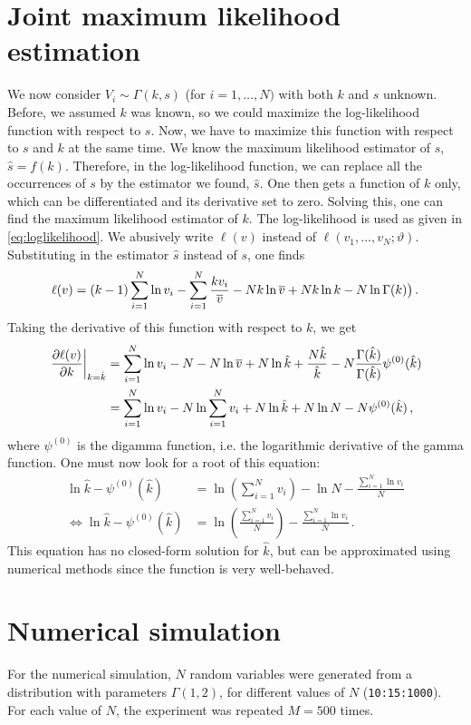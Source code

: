 \documentclass[final]{aomart}
\newtheorem[{}\it]{thm}{Theorem}[section]
\theoremstyle{definition}
\newtheorem*[{}\it]{notation}{Notation}
\numberwithin{equation}{section}
\newcommand{\dig}{\psi^{(0)}}
\renewcommand{\theta}{\vartheta}
\newcommand{\eval}[2][\right]{\relax
  \ifx#1\right\relax \left.\fi#2#1\rvert}
\begin{document}
\section{Joint maximum likelihood estimation}
\label{sec:joint}
We now consider \(V_i \sim \Gamma(k, s)\) (for \(i = 1,\ldots,N)\) with both \(k\) and \(s\) unknown.
Before, we assumed \(k\) was known, so we could maximize the log-likelihood function with respect to \(s\).
Now, we have to maximize this function with respect to \(s\) and \(k\) at the same time.
We know the maximum likelihood estimator of \(s\), \(\hat{s} = f(k)\).
Therefore, in the log-likelihood function, we can replace all the occurrences of \(s\) by the estimator we found, \(\hat{s}\).
One then gets a function of \(k\) only, which can be differentiated and its derivative set to zero.
Solving this, one can find the maximum likelihood estimator of \(k\).
The log-likelihood is used as given in \eqref{eq:loglikelihood}.
We abusively write \(\ell(v)\) instead of \(\ell(v_1, \ldots, v_N; \theta)\).
Substituting in the estimator \(\hat{s}\) instead of \(s\), one finds
\begin{align}
\ell(v) = (k-1) \sum_{i=1}^{N}\ln v_i - \sum_{i=1}^{N} \frac{kv_i}{\overline{v}} - N k \ln \overline{v} + N k \ln k - N \ln \Gamma(k)\big)\,.
\end{align}
Taking the derivative of this function with respect to \(k\), we get
\begin{align}
\eval{\frac{\partial \ell(v)}{\partial k}}_{k = \hat{k}} &= \sum_{i=1}^N \ln v_i - N - N \ln \widebar{v} + N \ln \hat{k} + \frac{N\hat{k}}{\hat{k}} - N\frac{\Gamma(\hat{k})}{\Gamma(\hat{k})}\dig(\hat{k})\\
&= \sum_{i=1}^N \ln v_i - N \ln \sum_{i=1}^N v_i + N \ln \hat{k}  + N \ln N - N \dig(\hat{k})\,,
\end{align}
where \(\dig\) is the digamma function, i.e. the logarithmic derivative of the gamma function.
One must now look for a root of this equation:
\begin{align}
\ln \hat{k} - \dig(\hat{k}) &= \ln \left(\sum_{i=1}^N v_i\right) - \ln N - \frac{\sum_{i=1}^N \ln v_i}{N}\\
\iff \ln \hat{k}  - \dig(\hat{k}) &= \ln \left(\frac{\sum_{i=1}^N v_i}{N}\right) - \frac{\sum_{i=1}^N \ln v_i}{N}\,.\label{eq:mlk}
\end{align}
This equation has no closed-form solution for \(\hat{k}\), but can be approximated using numerical methods since the function is very well-behaved.

\section{Numerical simulation}
For the numerical simulation, \(N\) random variables were generated from a distribution with parameters \(\Gamma(1, 2)\), for different values of \(N\) (\texttt{10:15:1000}).
For each value of \(N\), the experiment was repeated \(M = 500\) times.
\end{document}
